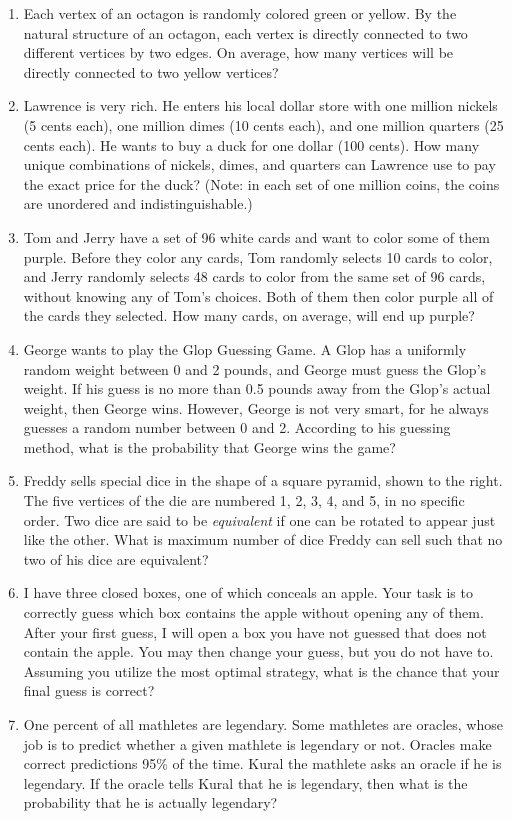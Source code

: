 \documentclass[11pt]{article}
\begin{document}
\begin{enumerate}[1.]
			\item Each vertex of an octagon is randomly colored green or yellow. By the natural structure of an octagon, each vertex is directly connected to two different vertices by two edges. On average, how many vertices will be directly connected to two yellow vertices?
			
			\item Lawrence is very rich. He enters his local dollar store with one million nickels (5 cents each), one million dimes (10 cents each), and one million quarters (25 cents each). He wants to buy a duck for one dollar (100 cents). How many unique combinations of nickels, dimes, and quarters can Lawrence use to pay the exact price for the duck? (Note: in each set of one million coins, the coins are unordered and indistinguishable.)
			
			\item Tom and Jerry have a set of 96 white cards and want to color some of them purple. Before they color any cards, Tom randomly selects 10 cards to color, and Jerry randomly selects 48 cards to color from the same set of 96 cards, without knowing any of Tom's choices. Both of them then color purple all of the cards they selected. How many cards, on average, will end up purple?
			
			\item George wants to play the Glop Guessing Game. A Glop has a uniformly random weight between 0 and 2 pounds, and George must guess the Glop's weight. If his guess is no more than 0.5 pounds away from the Glop's actual weight, then George wins. However, George is not very smart, for he always guesses a random number between 0 and 2. According to his guessing method, what is the probability that George wins the game?
			
			\item Freddy sells special dice in the shape of a square pyramid, shown to the right. The five vertices of the die are numbered 1, 2, 3, 4, and 5, in no specific order. Two dice are said to be \textit{equivalent} if one can be rotated to appear just like the other. What is maximum number of dice Freddy can sell such that no two of his dice are equivalent?
			
			\item I have three closed boxes, one of which conceals an apple. Your task is to correctly guess which box contains the apple without opening any of them. After your first guess, I will open a box you have not guessed that does not contain the apple. You may then change your guess, but you do not have to. Assuming you utilize the most optimal strategy, what is the chance that your final guess is correct?
			
			\item One percent of all mathletes are legendary. Some mathletes are oracles, whose job is to predict whether a given mathlete is legendary or not. Oracles make correct predictions 95\% of the time. Kural the mathlete asks an oracle if he is legendary. If the oracle tells Kural that he is legendary, then what is the probability that he is actually legendary?
		\end{enumerate}
\end{document}
